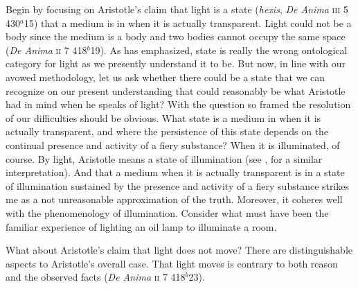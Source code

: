 Begin by focusing on Aristotle's claim that light is a state (\emph{hexis}, \emph{De Anima} \textsc{iii} 5 430\( ^{a} \)15) that a medium is in when it is actually transparent. Light could not be a body since the medium is a body and two bodies cannot occupy the same space (\emph{De Anima} \textsc{ii} 7 418\( ^{b} \)19). As \citet{Burnyeat:1995fk} has emphasized, state is really the wrong ontological category for light as we presently understand it to be. But now, in line with our avowed methodology, let us ask whether there could be a state that we can recognize on our present understanding that could reasonably be what Aristotle had in mind when he speaks of light? With the question so framed the resolution of our difficulties should be obvious. What state is a medium in when it is actually transparent, and where the persistence of this state depends on the continual presence and activity of a fiery substance? When it is illuminated, of course. By light, Aristotle means a state of illumination (see \citealt[122]{Thorp:1982fk}, for a similar interpretation). And that a medium when it is actually transparent is in a state of illumination sustained by the presence and activity of a fiery substance strikes me as a not unreasonable approximation of the truth. Moreover, it coheres well with the phenomenology of illumination. Consider what must have been the familiar experience of lighting an oil lamp to illuminate a room.

What about Aristotle's claim that light does not move? There are distinguishable aspects to Aristotle's overall case. That light moves is contrary to both reason and the observed facts (\emph{De Anima} \textsc{ii} 7 418\( ^{b} \)23).

